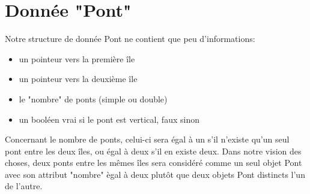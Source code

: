 \section{Donnée "Pont"}
Notre structure de donnée Pont ne contient que peu d'informations:
\begin{itemize}
    \item un pointeur vers la première île
    \item un pointeur vers la deuxième île
    \item le "nombre" de ponts (simple ou double)
    \item un booléen vrai si le pont est vertical, faux sinon
\end{itemize}
\smallbreak
Concernant le nombre de ponts, celui-ci sera égal à un s'il n'existe qu'un seul pont entre les deux îles, ou égal à deux s'il en existe deux. Dans notre vision des choses, deux ponts entre les mêmes îles sera considéré comme un seul objet Pont avec son attribut "nombre" ègal à deux plutôt que deux objets Pont distincts l'un de l'autre.

